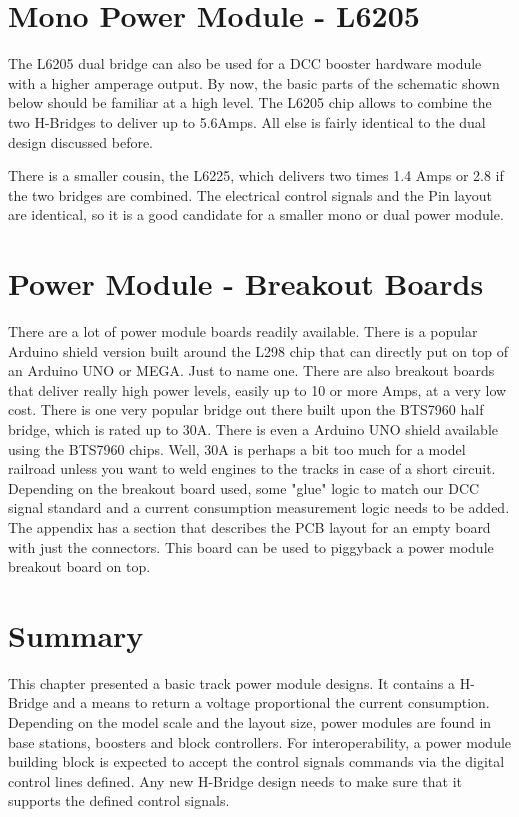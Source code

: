 \section{Mono Power Module - L6205}

The L6205 dual bridge can also be used for a DCC booster hardware module with a higher amperage output. By now, the basic parts of the schematic shown below should be familiar at a high level. The L6205 chip allows to combine the two H-Bridges to deliver up to 5.6Amps. All else is fairly identical to the dual design discussed before.


There is a smaller cousin, the L6225, which delivers two times 1.4 Amps or 2.8 if the two bridges are combined. The electrical control signals and the Pin layout are identical, so it is a good candidate for a smaller mono or dual power module.

\section{Power Module - Breakout Boards}

There are a lot of power module boards readily available. There is a popular Arduino shield version built around the L298 chip that can directly put on top of an Arduino UNO or MEGA. Just to name one. There are also breakout boards that deliver really high power levels, easily up to 10 or more Amps, at a very low cost. There is one very popular bridge out there built upon the BTS7960 half bridge, which is rated up to 30A. There is even a Arduino UNO shield available using the BTS7960 chips. Well, 30A is perhaps a bit too much for a model railroad unless you want to weld engines to the tracks in case of a short circuit. Depending on the breakout board used, some "glue" logic to match our DCC signal standard and a current consumption measurement logic needs to be added. The appendix has a section that describes the PCB layout for an empty board with just the connectors. This board can be used to piggyback a power module breakout board on top.

\section{Summary}

This chapter presented a basic track power module designs. It contains a H-Bridge and a means to return a voltage proportional the current consumption. Depending on the model scale and the layout size, power modules are found in base stations, boosters and block controllers. For interoperability, a power module building block is expected to accept the control signals commands via the digital control lines defined. Any new H-Bridge design needs to make sure that it supports the defined control signals.
